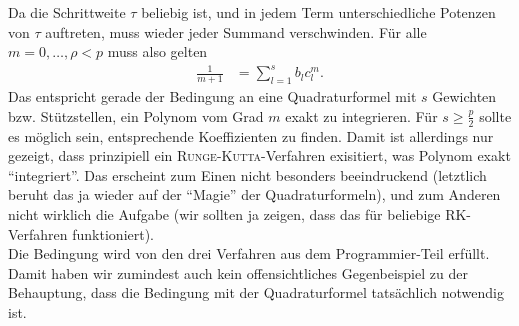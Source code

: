 \documentclass[english, parskip=full]{scrartcl}
\begin{document}
Da die Schrittweite $\tau$ beliebig ist, und in jedem Term unterschiedliche Potenzen von $\tau$ auftreten, muss wieder jeder Summand verschwinden.
Für alle $m=0,\dots,\rho < p$ muss also gelten
\begin{align}
\frac{1}{m+1} &= \sum_{l=1}^s b_l c_l^m.
\end{align}
Das entspricht gerade der Bedingung an eine Quadraturformel mit $s$ Gewichten bzw. Stützstellen, ein Polynom vom Grad $m$ exakt zu integrieren.
Für $s\ge \frac{p}{2}$ sollte es möglich sein, entsprechende Koeffizienten zu finden.
Damit ist allerdings nur gezeigt, dass prinzipiell ein \textsc{Runge-Kutta}-Verfahren exisitiert, was Polynom exakt ``integriert''.
Das erscheint zum Einen nicht besonders beeindruckend (letztlich beruht das ja wieder auf der ``Magie'' der Quadraturformeln), und zum Anderen nicht wirklich die Aufgabe (wir sollten ja zeigen, dass das für beliebige RK-Verfahren funktioniert).
\\
Die Bedingung wird von den drei Verfahren aus dem Programmier-Teil erfüllt.
Damit haben wir zumindest auch kein offensichtliches Gegenbeispiel zu der Behauptung, dass die Bedingung mit der Quadraturformel tatsächlich notwendig ist.
 

\end{document}
